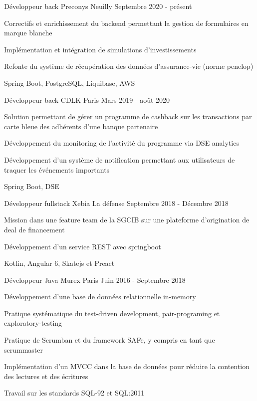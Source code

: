 
\begin{cventries}
	
\cventry
{Développeur back}
{Preconys}
{Neuilly}
{Septembre 2020 - présent}
{
	\begin{cvitems}
	\item{Correctifs et enrichissement du backend permettant la gestion de formulaires en marque blanche}
	\item{Implémentation et intégration de simulations d'investissements}
	\item{Refonte du système de récupération des données d'assurance-vie (norme penelop)}
	\item{Spring Boot, PostgreSQL, Liquibase, AWS}
	\end{cvitems}
}

\cventry
{Développeur back}
{CDLK}
{Paris}
{Mars 2019 - août 2020}
{
	\begin{cvitems}
	\item{Solution permettant de gérer un programme de cashback sur les transactions par carte bleue des adhérents d'une banque partenaire}
	\item{Développement du monitoring de l'activité du programme via DSE analytics}
	\item{Développement d'un système de notification permettant aux utilisateurs de traquer les événements importants}
	\item{Spring Boot, DSE}
	\end{cvitems}
}

\cventry
{Développeur fullstack}
{Xebia}
{La défense}
{Septembre 2018 - Décembre 2018}
{
	\begin{cvitems}
	\item{Mission dans une feature team de la SGCIB sur une plateforme d'origination de deal de financement}
	\item{Développement d'un service REST avec springboot}
	\item{Kotlin, Angular 6, Skatejs et Preact}
	\end{cvitems}
}

\cventry
{Développeur Java}
{Murex}
{Paris}
{Juin 2016 - Septembre 2018}
{
	\begin{cvitems}
	\item{Développement d'une base de données relationnelle in-memory}
	\item{Pratique systématique du test-driven development, pair-programing et exploratory-testing}
	\item{Pratique de Scrumban et du framework SAFe, y compris en tant que scrummaster}
	\item{Implémentation d'un MVCC dans la base de données pour réduire la contention des lectures et des écritures}
	\item{Travail sur les standards SQL-92 et SQL:2011}
	\end{cvitems}
}


\end{cventries}
